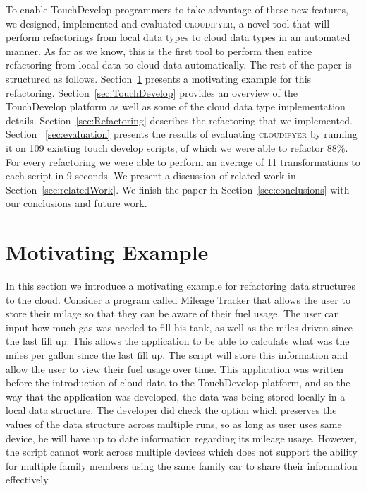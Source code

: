 \documentclass{sigplanconf}
\begin{document}
To enable TouchDevelop programmers to take advantage of these new features, we designed, implemented and evaluated  \textsc{cloudifyer}, a novel tool that will perform refactorings from local data types to cloud data types in an automated manner. As far as we know, this is the first tool to perform then entire refactoring from local data to cloud data automatically.
The rest of the paper is structured as follows.  Section~\ref{sec:motivatingExample} presents a motivating example for this refactoring.  Section~\ref{sec:TouchDevelop} provides an overview of the TouchDevelop platform as well as some of the cloud data type implementation details.  Section~\ref{sec:Refactoring} describes the refactoring that we implemented.  Section ~\ref{sec:evaluation} presents the results of evaluating \textsc{cloudifyer} by running it on 109 existing touch develop scripts, of which we were able to refactor 88\%.  For every refactoring we were able to perform an average of 11 transformations to each script in 9 seconds. We present a discussion of related work in Section~\ref{sec:relatedWork}.  We finish the paper in Section~\ref{sec:conclusions} with our conclusions and future work.


\section{Motivating Example}
\label{sec:motivatingExample}
In this section we introduce a motivating example for refactoring data structures to the cloud.   Consider a program called Mileage Tracker that allows the user to store their milage so that they can be aware of their fuel usage.  The user can input how much gas was needed to fill his tank, as well as the miles driven since the last fill up.  This allows the application to be able to calculate what was the miles per gallon since the last fill up.  The script will store this information and allow the user to view their fuel usage over time.  This application was written before the introduction of cloud data to the TouchDevelop platform, and so the way that the application was developed, the data was being stored locally in a local data structure.  The developer did check the option which preserves the values of the data structure across multiple runs, so as long as user uses same device, he will have up to date information regarding its mileage usage.  However, the script cannot work across multiple devices which does not support the ability for multiple family members using the same family car to share their information effectively.
\end{document}
